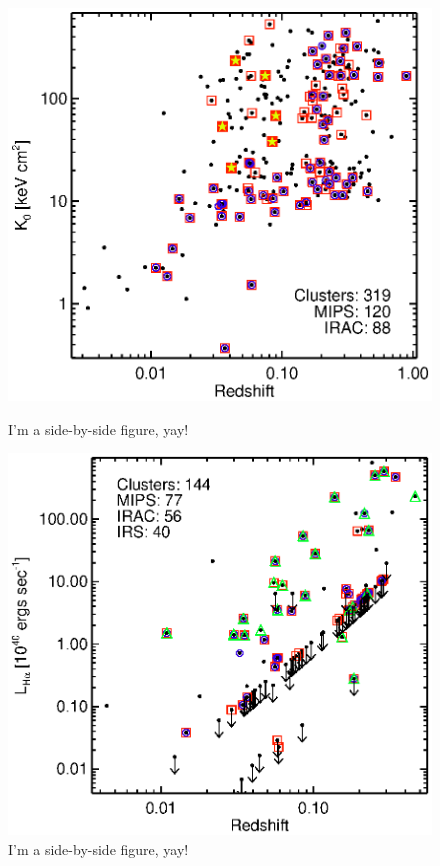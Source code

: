 \documentclass[letterpaper,11pt,onecolumn]{article}
\begin{document}
\begin{figure}[ht]
    \begin{minipage}[b]{0.5\linewidth}
        \centering
        \includegraphics*[scale=0.75, trim=30mm 15mm 30mm 15mm, clip]{spitzer_k0}
        \caption{I'm a side-by-side figure, yay!}
        \label{fig:figure1}
    \end{minipage}
    \hspace{0cm}
    \begin{minipage}[b]{0.5\linewidth}
        \centering
        \includegraphics*[scale=0.75, trim=30mm 15mm 30mm 15mm, clip]{spitzer_lha}
        \caption{I'm a side-by-side figure, yay!}
        \label{fig:figure2}
    \end{minipage}
\end{figure}
\end{document}
